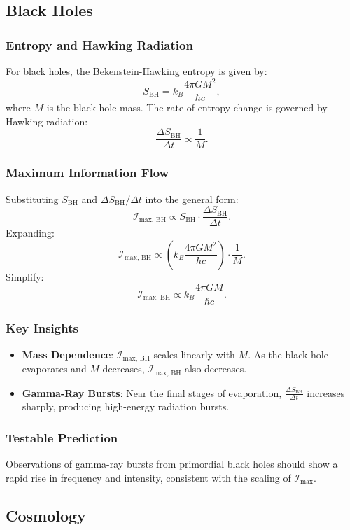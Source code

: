 \documentclass[12pt]{article}
\begin{document}
\subsection{Black Holes}
\subsubsection{Entropy and Hawking Radiation}
For black holes, the Bekenstein-Hawking entropy is given by:
\[
S_{\text{BH}} = k_B \frac{4 \pi G M^2}{\hbar c},
\]
where \( M \) is the black hole mass. The rate of entropy change is governed by Hawking radiation:
\[
\frac{\Delta S_{\text{BH}}}{\Delta t} \propto \frac{1}{M}.
\]

\subsubsection{Maximum Information Flow}
Substituting \( S_{\text{BH}} \) and \( \Delta S_{\text{BH}} / \Delta t \) into the general form:
\[
\mathcal{I}_{\text{max, BH}} \propto S_{\text{BH}} \cdot \frac{\Delta S_{\text{BH}}}{\Delta t}.
\]
Expanding:
\[
\mathcal{I}_{\text{max, BH}} \propto \left(k_B \frac{4 \pi G M^2}{\hbar c}\right) \cdot \frac{1}{M}.
\]
Simplify:
\[
\mathcal{I}_{\text{max, BH}} \propto k_B \frac{4 \pi G M}{\hbar c}.
\]

\subsubsection{Key Insights}
\begin{itemize}
    \item \textbf{Mass Dependence}: \( \mathcal{I}_{\text{max, BH}} \) scales linearly with \( M \). As the black hole evaporates and \( M \) decreases, \( \mathcal{I}_{\text{max, BH}} \) also decreases.
    \item \textbf{Gamma-Ray Bursts}: Near the final stages of evaporation, \( \frac{\Delta S_{\text{BH}}}{\Delta t} \) increases sharply, producing high-energy radiation bursts.
\end{itemize}

\subsubsection{Testable Prediction}
Observations of gamma-ray bursts from primordial black holes should show a rapid rise in frequency and intensity, consistent with the scaling of \( \mathcal{I}_{\text{max}} \).

\subsection{Cosmology}
\end{document}
